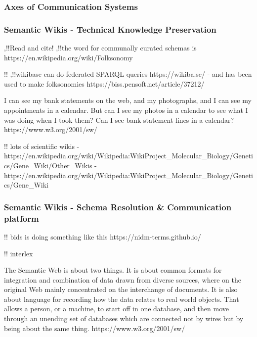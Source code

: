 \documentclass{article}
\begin{document}
\hypertarget{axes-of-communication-systems}{%
\subsubsection{Axes of Communication
Systems}\label{axes-of-communication-systems}}

\hypertarget{semantic-wikis---technical-knowledge-preservation}{%
\subsubsection{Semantic Wikis - Technical Knowledge
Preservation}\label{semantic-wikis---technical-knowledge-preservation}}

\cite{kamelboulosSemanticWikisComprehensible2009},!!Read and cite! \cite{classeDistributedInfrastructureSupport2017},!!the word for communally curated schemas is
https://en.wikipedia.org/wiki/Folksonomy

!! \cite{goodSocialTaggingLife2009},!!wikibase can do federated SPARQL queries https://wikiba.se/ - and has
been used to make folksonomies https://biss.pensoft.net/article/37212/

\begin{leftbar}
I can see my bank statements on the web, and my photographs, and I can
see my appointments in a calendar. But can I see my photos in a calendar
to see what I was doing when I took them? Can I see bank statement lines
in a calendar? https://www.w3.org/2001/sw/
\end{leftbar}

!! lots of scientific wikis -
https://en.wikipedia.org/wiki/Wikipedia:WikiProject\_Molecular\_Biology/Genetics/Gene\_Wiki/Other\_Wikis
-
https://en.wikipedia.org/wiki/Wikipedia:WikiProject\_Molecular\_Biology/Genetics/Gene\_Wiki

\hypertarget{semantic-wikis---schema-resolution-communication-platform}{%
\subsubsection{Semantic Wikis - Schema Resolution \& Communication
platform}\label{semantic-wikis---schema-resolution-communication-platform}}

!! bids is doing something like this https://nidm-terms.github.io/

!! interlex

\begin{leftbar}
The Semantic Web is about two things. It is about common formats for
integration and combination of data drawn from diverse sources, where on
the original Web mainly concentrated on the interchange of documents. It
is also about language for recording how the data relates to real world
objects. That allows a person, or a machine, to start off in one
database, and then move through an unending set of databases which are
connected not by wires but by being about the same thing.
https://www.w3.org/2001/sw/
\end{leftbar}
\end{document}
